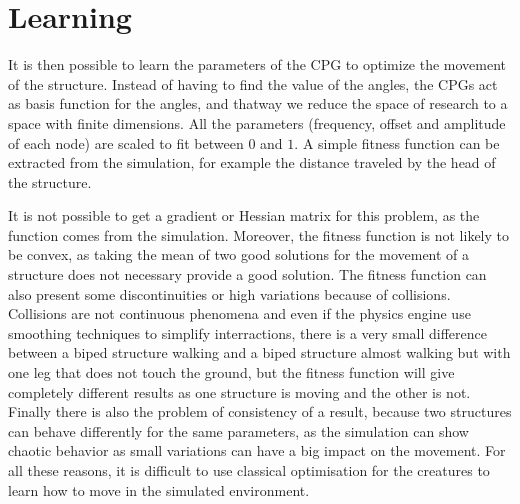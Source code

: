 
\chapter{Learning} %

\label{Chapter 4} %


It is then possible to learn the parameters of the CPG to optimize the movement of the structure. Instead of having to find the value of the angles, the CPGs act as basis function for the angles, and thatway we reduce the space of research to a space with finite dimensions. All the parameters (frequency, offset and amplitude of each node) are scaled to fit between $0$ and $1$. A simple fitness function can be extracted from the simulation, for example the distance traveled by the head of the structure. 

It is not possible to get a gradient or Hessian matrix for this problem, as the function comes from the simulation. Moreover, the fitness function is not likely to be convex, as taking the mean of two good solutions for the movement of a structure does not necessary provide a good solution. The fitness function can also present some discontinuities or high variations because of collisions. Collisions are not continuous phenomena and even if the physics engine use smoothing techniques to simplify interractions, there is a very small difference between a biped structure walking and a biped structure almost walking but with one leg that does not touch the ground, but the fitness function will give completely different results as one structure is moving and the other is not. Finally there is also the problem of consistency of a result, because two structures can behave differently for the same parameters, as the simulation can show chaotic behavior as small variations can have a big impact on the movement. For all these reasons, it is difficult to use classical optimisation for the creatures to learn how to move in the simulated environment. 

